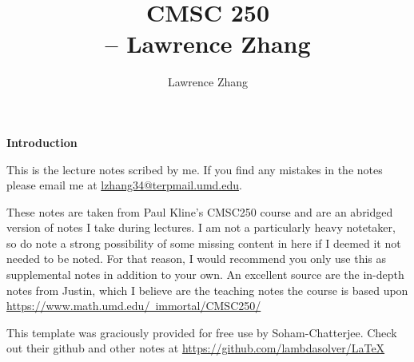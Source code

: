 \documentclass{report}
\title{\Huge{CMSC 250}\\ \hspace{4cm}-- Lawrence Zhang}
\author{\huge{Lawrence Zhang}}
\date{}
\begin{document}
\thispagestyle{empty}
\newpage%
\vspace*{5cm}

\begin{center}
	\textbf{Introduction}
\end{center}

This is the lecture notes scribed by me. If you find any mistakes in the notes please email me at \url{lzhang34@terpmail.umd.edu}. 

These notes are taken from Paul Kline's CMSC250 course and are an abridged version of notes I take during lectures. I am not a particularly heavy notetaker, so do note a strong possibility of some missing content in here if I deemed it not needed to be noted. For that reason, I would recommend you only use this as supplemental notes in addition to your own. An excellent source are the in-depth notes from Justin, which I believe are the teaching notes the course is based upon \href{https://www.math.umd.edu/~immortal/CMSC250/}{https://www.math.umd.edu/~immortal/CMSC250/}

This template was graciously provided for free use by Soham-Chatterjee. Check out their github and other notes at \href{https://github.com/lambdasolver/LaTeX}{https://github.com/lambdasolver/LaTeX}
\pagebreak

\tableofcontents
\pagebreak


\end{document}
